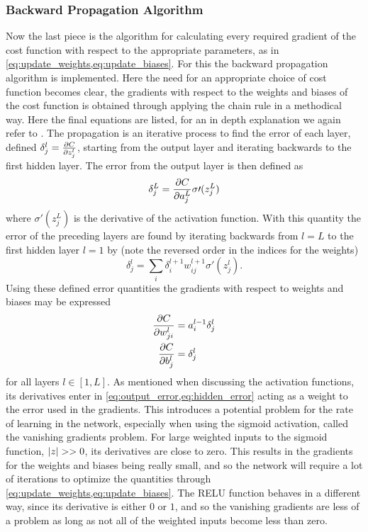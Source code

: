 \documentclass[10pt, twocolumn]{article}
\begin{document}
\subsubsection{Backward Propagation Algorithm}
\label{subsubsec:Theory/NN/Backward_prop_algo}
Now the last piece is the algorithm for calculating every required gradient of the cost function with respect to the appropriate parameters, as in \cref{eq:update_weights,eq:update_biases}. For this the backward propagation algorithm is implemented. Here the need for an appropriate choice of cost function becomes clear, the gradients with respect to the weights and biases of the cost function is obtained through applying the chain rule in a methodical way. Here the final equations are listed, for an in depth explanation we again refer to \cite{NN_deePlearning_michael}. The propagation is an iterative process to find the error of each layer, defined $\delta^l_j = \pdv{C}{z_j^l}$, starting from the output layer and iterating backwards to the first hidden layer. The error from the output layer is then defined as
\begin{equation}
    \delta^L_j = \pdv{C}{a^L_j}\sigma\prime(z_j^L)
    \label{eq:output_error}
\end{equation}
where $\sigma\prime(z_j^L)$ is the derivative of the activation function. With this quantity the error of the preceding layers are found by iterating backwards from $l=L$ to the first hidden layer $l=1$ by (note the reversed order in the indices for the weights)
\begin{equation}
    \delta^l_j = \sum_i \delta_i^{l+1} w_{ij}^{l+1}\sigma\prime(z^l_j).
    \label{eq:hidden_error}
\end{equation}
Using these defined error quantities the gradients with respect to weights and biases may be expressed
\begin{align}
    \pdv{C}{w_{ji}^l} &= a_i^{l-1} \delta_j^l
    \label{eq:gradient_w}
    \\
    \pdv{C}{b_j^l} &= \delta_j^l
    \label{eq:gradient_b}
\end{align}
for all layers $l\in[1,L]$. As mentioned when discussing the activation functions, its derivatives enter in \cref{eq:output_error,eq:hidden_error} acting as a weight to the error used in the gradients. This introduces a potential problem for the rate of learning in the network, especially when using the sigmoid activation, called the vanishing gradients problem. For large weighted inputs to the sigmoid function, $\abs{z}>>0$, its derivatives are close to zero. This results in the gradients for the weights and biases being really small, and so the network will require a lot of iterations to optimize the quantities through \cref{eq:update_weights,eq:update_biases}. The RELU function behaves in a different way, since its derivative is either $0$ or $1$, and so the vanishing gradients are less of a problem as long as not all of the weighted inputs become less than zero.
\end{document}
